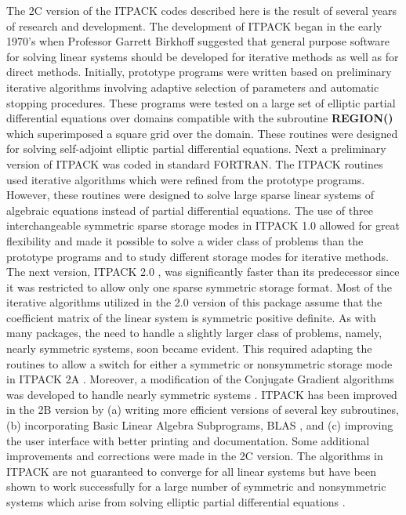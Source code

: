 The 2C version of the ITPACK codes described here is the result of
several years of research and development.  The development of ITPACK
began in the early 1970's when Professor Garrett Birkhoff suggested that
general purpose software for solving linear systems should be developed
for iterative methods as well as for direct methods.  Initially,
prototype programs were written based on preliminary iterative
algorithms involving adaptive selection of parameters and automatic
stopping procedures.  These programs were tested on a large set of
elliptic partial differential equations over domains compatible with the
subroutine {\bf REGION()} \cite{8} which superimposed a square grid over the
domain.  These routines were designed for solving self-adjoint elliptic
partial differential equations.  Next a preliminary version of ITPACK
was coded in standard FORTRAN.  The ITPACK routines used iterative
algorithms which were refined from the prototype programs.  However,
these routines were designed to solve large sparse linear systems of
algebraic equations instead of partial differential equations.  The use
of three interchangeable symmetric sparse storage modes in ITPACK 1.0
\cite{3} allowed for great flexibility and made it possible to solve a wider
class of problems than the prototype programs and to study different
storage modes for iterative methods.  The next version, ITPACK 2.0 
\cite{4}, was significantly faster than its predecessor since it was 
restricted to allow only one sparse symmetric storage format.  Most of 
the iterative algorithms utilized in the 2.0 version of this package 
assume that the coefficient matrix of the linear system is symmetric 
positive definite.  As with many packages, the need to handle a slightly 
larger class of problems, namely, nearly symmetric systems, soon became 
evident.  This required adapting the routines to allow a switch for 
either a symmetric or nonsymmetric storage mode in ITPACK 2A \cite{5}.
Moreover, a modification of the Conjugate Gradient algorithms was 
developed to handle nearly symmetric systems \cite{12}.  ITPACK has been 
improved in the 2B version \cite{14} by (a) writing more efficient 
versions of several key subroutines, (b) incorporating Basic Linear 
Algebra Subprograms, BLAS \cite{15}, and (c) improving the user interface 
with better printing and documentation.  Some additional improvements 
and corrections were made in the 2C version.  The algorithms in ITPACK 
are not guaranteed to converge for all linear systems but have been 
shown to work successfully for a large number of symmetric and 
nonsymmetric systems which arise from solving elliptic partial 
differential equations \cite{1,13}.
 
